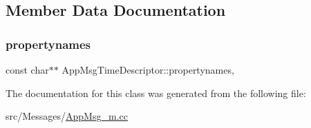 \subsection{Member Data Documentation}
\mbox{\label{class_app_msg_time_descriptor_a102cbf09a1ba7e40df81cca8c3c503b4}} 
\subsubsection{\texorpdfstring{propertynames}{propertynames}}
{\footnotesize\ttfamily const char$\ast$$\ast$ App\+Msg\+Time\+Descriptor\+::propertynames\hspace{0.3cm}{\ttfamily [mutable]}, {\ttfamily [private]}}



The documentation for this class was generated from the following file\+:\begin{DoxyCompactItemize}
\item 
src/\+Messages/\hyperlink{_app_msg__m_8cc}{App\+Msg\+\_\+m.\+cc}\end{DoxyCompactItemize}
